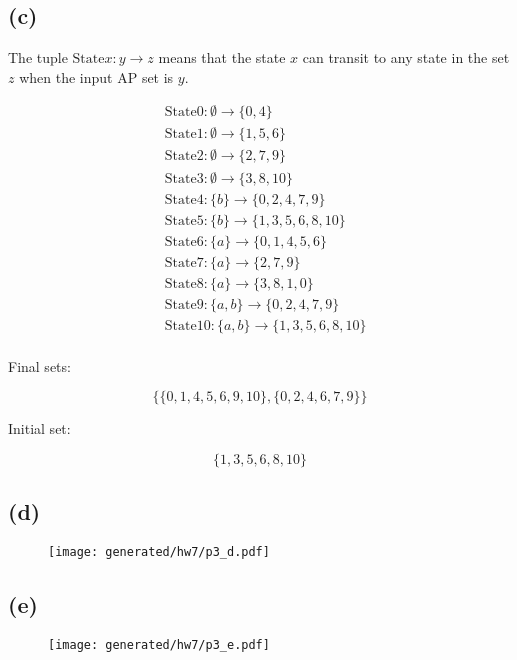 \subsection*{(c)}

The tuple $\text{State} x: y \rightarrow z$ means that the state $x$ can transit to any state in the set $z$ when the input AP set is $y$.

$$
\begin{aligned}
& \text{State} 0: \emptyset \to \{ 0, 4 \} \\
& \text{State} 1: \emptyset \to \{ 1, 5, 6 \} \\
& \text{State} 2: \emptyset \to \{ 2, 7, 9 \} \\
& \text{State} 3: \emptyset \to \{ 3, 8, 10 \} \\
& \text{State} 4: \{ b \} \to \{ 0, 2, 4, 7, 9 \} \\
& \text{State} 5: \{ b \} \to \{ 1, 3, 5, 6, 8, 10 \} \\
& \text{State} 6: \{ a \} \to \{ 0, 1, 4, 5, 6 \} \\
& \text{State} 7: \{ a \} \to \{ 2, 7, 9 \} \\
& \text{State} 8: \{ a \} \to \{ 3, 8, 1, 0 \} \\
& \text{State} 9: \{ a, b \} \to \{ 0, 2, 4, 7, 9 \} \\
& \text{State} 10: \{ a,b \} \to \{ 1, 3, 5, 6, 8, 10 \} \\
\end{aligned}
$$

Final sets:

$$
\{\{ 0, 1, 4, 5, 6, 9, 10 \}, \{ 0, 2, 4, 6, 7, 9 \} \}
$$

Initial set:

$$
\{ 1, 3, 5, 6, 8, 10 \}
$$

\subsection*{(d)}

\begin{figure}[H]
    \centering
    \texttt{[image: generated/hw7/p3\_d.pdf]}
\end{figure}

\subsection*{(e)}

\begin{figure}[H]
    \centering
    \texttt{[image: generated/hw7/p3\_e.pdf]}
\end{figure}

